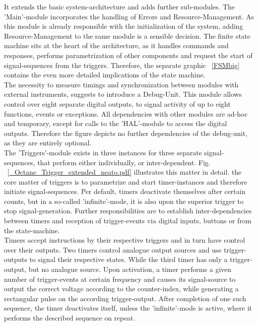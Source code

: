 	It extends the basic system-architecture and adds further sub-modules. The 'Main'-module incorporates the handling of Errors and Resource-Management. As this module is already responsible with the initialization of the system, adding Resource-Management to the same module is a sensible decision. The finite state machine sits at the heart of the architecture, as it handles commands and responses, performs parametrization of other components and request the start of signal-sequences from the triggers. Therefore, the separate graphic ~\ref{FSMbig} contains the even more detailed implications of the state machine. \\
	
	The necessity to measure timings and synchronization between modules with external instruments, suggests to introduce a Debug-Unit. This module allows control over eight separate digital outputs, to signal activity of up to eight functions, events or exceptions. All dependencies with other modules are ad-hoc and temporary, except for calls to the 'HAL'-module to access the digital outputs. Therefore the figure depicts no further dependencies of the debug-unit, as they are entirely optional. \\
	
	The 'Triggers'-module exists in three instances for three separate signal-sequences, that perform either individually, or inter-dependent. Fig. ~\ref{_Octane_Trigger_extended_neato.pdf} illustrates this matter in detail. the core matter of triggers is to parametrize and start timer-instances and therefore initiate signal-sequences. Per default, timers deactivate themselves after certain counts, but in a so-called 'infinite'-mode, it is also upon the superior trigger to stop signal-generation. Further responsibilities are to establish inter-dependencies between timers and reception of trigger-events via digital inputs, buttons or from the state-machine. \\
	
	Timers accept instructions by their respective triggers and in turn have control over their outputs. Two timers control analogue output sources and use trigger-outputs to signal their respective states. While the third timer has only a trigger-output, but no analogue source. Upon activation, a timer performs a given number of trigger-events at certain frequency and causes its signal-source to output the correct voltage according to the counter-index, while generating a rectangular pulse on the according trigger-output. After completion of one such sequence, the timer deactivates itself, unless the 'infinite'-mode is active, where it performs the described sequence on repeat. \\
	
